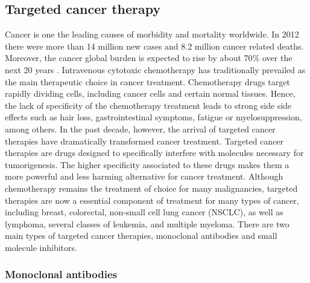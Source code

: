 \documentclass[11pt, b5paper,twoside]{tesi_upf}
\begin{document}
\subsection{Targeted cancer therapy}\label{targeted therapies}

\par Cancer is one the leading causes of morbidity and mortality worldwide. In 2012 there were more than 14 million new cases and 8.2 million cancer related deaths. Moreover, the cancer global burden is expected to rise by about 70$\%$ over the next 20 years \cite{WHO_CANCER}. Intravenous cytotoxic chemotherapy has traditionally prevailed as the main therapeutic choice in cancer treatment. Chemotherapy drugs target rapidly dividing cells, including cancer cells and certain normal tissues.  Hence, the lack of specificity of the chemotherapy treatment leads to strong side side effects such as hair loss, gastrointestinal symptoms, fatigue or myelosuppression, among others.  In the past decade, however, the arrival of targeted cancer therapies have dramatically transformed cancer treatment. Targeted cancer therapies are drugs designed to specifically interfere with molecules necessary for tumorigenesis. The higher specificity associated to these drugs makes them a more powerful and less harming alternative for cancer treatment. Although chemotherapy remains the treatment of choice for many malignancies, targeted therapies are now a essential component of treatment for many types of cancer, including breast, colorectal, non-small cell lung cancer (NSCLC), as well as lymphoma, several classes of leukemia, and multiple myeloma. There are two main types of targeted cancer therapies, monoclonal antibodies and small molecule inhibitors.

\subsubsection{Monoclonal antibodies}
\end{document}

